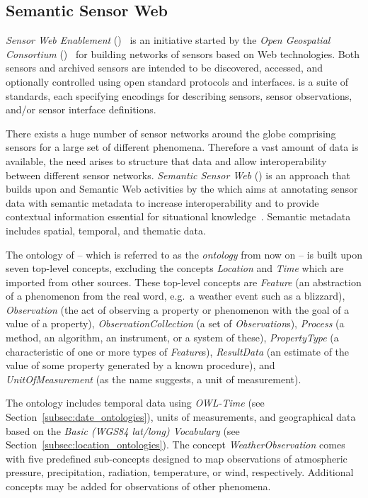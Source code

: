 \subsection{Semantic Sensor Web}
\label{subsec:onto1}

\emph{Sensor Web Enablement} ()~\cite{SensorWeb} is an initiative started by the \emph{Open Geospatial Consortium} ()~\cite{OGC} for building networks of sensors based on Web technologies. Both sensors and archived sensors are intended to be discovered, accessed, and optionally controlled using open standard protocols and interfaces.  is a suite of standards, each specifying encodings for describing sensors, sensor observations, and/or sensor interface definitions.

There exists a huge number of sensor networks around the globe comprising sensors for a large set of different phenomena. Therefore a vast amount of data is available, the need arises to structure that data and allow interoperability between different sensor networks. \emph{Semantic Sensor Web} () is an approach that builds upon  and Semantic Web activities by the  which aims at annotating sensor data with semantic metadata to increase interoperability and to provide contextual information essential for situational knowledge~\cite{SemanticSensorWeb}. Semantic metadata includes spatial, temporal, and thematic data.

The ontology of  -- which is referred to as the \emph{ ontology} from now on -- is built upon seven top-level concepts, excluding the concepts \emph{Location} and \emph{Time} which are imported from other sources. These top-level concepts are \emph{Feature} (an abstraction of a phenomenon from the real word, e.g.\ a weather event such as a blizzard), \emph{Observation} (the act of observing a property or phenomenon with the goal of a value of a property), \emph{ObservationCollection} (a set of \emph{Observation}s), \emph{Process} (a method, an algorithm, an instrument, or a system of these), \emph{PropertyType} (a characteristic of one or more types of \emph{Feature}s), \emph{ResultData} (an estimate of the value of some property generated by a known procedure), and \emph{UnitOfMeasurement} (as the name suggests, a unit of measurement).

The  ontology includes temporal data using \emph{OWL-Time} (see Section~\ref{subsec:date_ontologies}), units of measurements, and geographical data based on the \emph{Basic (WGS84 lat/long) Vocabulary} (see Section~\ref{subsec:location_ontologies}). The concept \emph{WeatherObservation} comes with five predefined sub-concepts designed to map observations of atmospheric pressure, precipitation, radiation, temperature, or wind, respectively. Additional concepts may be added for observations of other phenomena.

